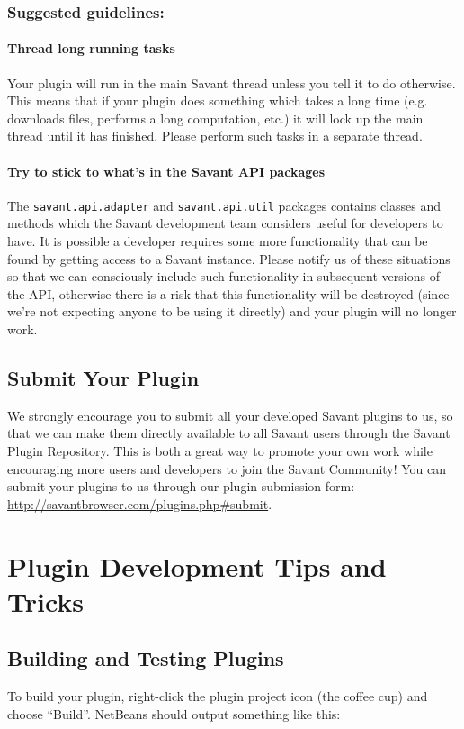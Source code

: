 \documentclass[times,11pt]{report}
\begin{document}
\subsection*{Suggested guidelines:}
\subsubsection{Thread long running tasks}
Your plugin will run in the main Savant thread unless you tell it to do otherwise. This means that if your plugin does something which takes a long time (e.g. downloads files, performs a long computation, etc.) it will lock up the main thread until it has finished. Please perform such tasks in a separate thread.\\

\subsubsection{Try to stick to what's in the Savant API packages}
The {\tt savant.api.adapter} and {\tt savant.api.util} packages contains classes and methods which the Savant development team considers useful for developers to have. It is possible a developer requires some more functionality that can be found by getting access to a Savant instance. Please notify us of these situations so that we can consciously include such functionality in subsequent versions of the API, otherwise there is a risk that this functionality will be destroyed (since we're not expecting anyone to be using it directly) and your plugin will no longer work.

\section{Submit Your Plugin}
We strongly encourage you to submit all your developed Savant plugins to us, so that we can make them directly available to all Savant users through the Savant Plugin Repository. This is both a great way to promote your own work while encouraging more users and developers to join the Savant Community! You can submit your plugins to us through our plugin submission form: \href{http://savantbrowser.com/plugins.php\#submit}{http://savantbrowser.com/plugins.php\#submit}.

\chapter{Plugin Development Tips and Tricks}
\section{Building and Testing Plugins}
\label{BuildingPlugins}
To build your plugin, right-click the plugin project icon (the coffee cup) and choose ``Build''. NetBeans should output something like this:
 
\end{document}
